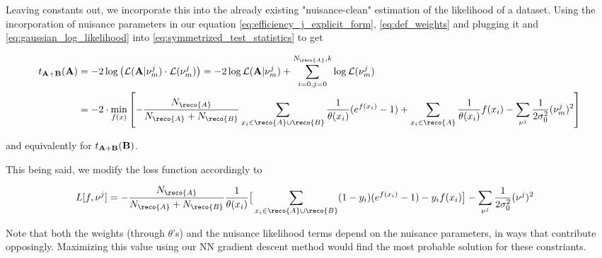 \documentclass[../thesis.tex]{subfiles}
\begin{document}
Leaving constants out, we incorporate this into the already existing "nuisance-clean" estimation of the likelihood of a dataset. Using the incorporation of nuisance parameters in our equation \ref{eq:efficiency_j_explicit_form}, \ref{eq:def_weights} and plugging it and \ref{eq:gaussian_log_likelihood} into \ref{eq:symmetrized_test_statistics} to get

$$
\begin{aligned} \label{eq:def_test_statistic_with_nuisance}
t_{\dataset{A}+\dataset{B}}(\dataset{A}) &= -2 \log \big( \likelihood(\dataset{A}| \nu^j_m) \cdot \likelihood(\nu^j_m) \big) = -2 \log \likelihood(\dataset{A}|\nu^j_m) + \sum_{i=0,j=0}^{N_\reco{A}, k} \log \likelihood(\nu^j_m) \\
 &= -2 \cdot \min_{f(x)}
\left[
    - \frac{N_{\reco{A}}}{N_{\reco{A}} + N_{\reco{B}}}
    \sum_{x_i \in \reco{A} \cup \reco{B}} \frac{1}{\theta(x_i)} (e^{f(x_i)} - 1)
    + \sum_{x_i \in \reco{A}} \frac{1}{\theta(x_i)} f(x_i)
    - \sum_{\nu^j} \frac{1}{2 \sigma_0^2} (\nu^j_m)^2
\right]
\end{aligned}
$$

and equivalently for $t_{{\mathbf{A}}+{\mathbf{B}}}({\mathbf{B}})$.

This being said, we modify the loss function accordingly to

$$
\begin{aligned} \label{eq:loss_function_with_nuisance}
L[f, \nu^j] &=
    - \frac{N_{\reco{A}}}{N_{\reco{A}} + N_{\reco{B}}} \frac{1}{\theta(x_i)}
    \big[
        \sum_{x_i \in \reco{A} \cup \reco{B}}
        (1-y_i)(e^{f(x_i)} - 1)
        - y_i f(x_i)
    \big]
    - \sum_{\nu^j} \frac{1}{2 \sigma_0^2} (\nu^j)^2
\end{aligned}
$$

Note that both the weights (through $\theta$'s) and the nuisance likelihood terms depend on the nuisance parameters, in ways that contribute opposingly. Maximizing this value using our NN gradient descent method would find the most probable solution for these constriants.
\end{document}
